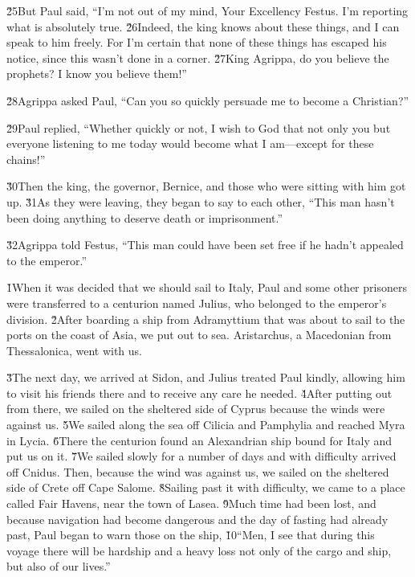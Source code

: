 \v{25}But Paul said, ``I'm not out of my mind, Your Excellency Festus. I'm reporting what is absolutely true. \v{26}Indeed, the king knows about these things, and I can speak to him freely. For I'm certain that none of these things has escaped his notice, since this wasn't done in a corner. \v{27}King Agrippa, do you believe the prophets? I know you believe them!''

\v{28}Agrippa asked Paul, ``Can you so quickly persuade me to become a Christian?''

\v{29}Paul replied, ``Whether quickly or not, I wish to God that not only you but everyone listening to me today would become what I am---except for these chains!''

\v{30}Then the king, the governor, Bernice, and those who were sitting with him got up. \v{31}As they were leaving, they began to say to each other, ``This man hasn't been doing anything to deserve death or imprisonment.''

\v{32}Agrippa told Festus, ``This man could have been set free if he hadn't appealed to the emperor.''

\v{1}When it was decided that we should sail to Italy, Paul and some other prisoners were transferred to a centurion named Julius, who belonged to the emperor's division. \v{2}After boarding a ship from Adramyttium that was about to sail to the ports on the coast of Asia, we put out to sea. Aristarchus, a Macedonian from Thessalonica, went with us.

\v{3}The next day, we arrived at Sidon, and Julius treated Paul kindly, allowing him to visit his friends there and to receive any care he needed. \v{4}After putting out from there, we sailed on the sheltered side of Cyprus because the winds were against us. \v{5}We sailed along the sea off Cilicia and Pamphylia and reached Myra in Lycia. \v{6}There the centurion found an Alexandrian ship bound for Italy and put us on it. \v{7}We sailed slowly for a number of days and with difficulty arrived off Cnidus. Then, because the wind was against us, we sailed on the sheltered side of Crete off Cape Salome. \v{8}Sailing past it with difficulty, we came to a place called Fair Havens, near the town of Lasea. \v{9}Much time had been lost, and because navigation had become dangerous and the day of fasting had already past, Paul began to warn those on the ship, \v{10}``Men, I see that during this voyage there will be hardship and a heavy loss not only of the cargo and ship, but also of our lives.''


